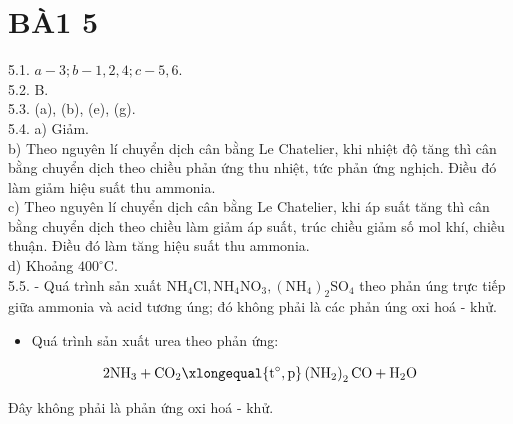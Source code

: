 \documentclass[10pt]{article}
\begin{document}
\section*{BÀ1 5}
5.1. $a-3 ; b-1,2,4 ; c-5,6$.\\
5.2. B.\\
5.3. (a), (b), (e), (g).\\
5.4. a) Giảm.\\
b) Theo nguyên lí chuyển dịch cân bằng Le Chatelier, khi nhiệt độ tăng thì cân bằng chuyển dịch theo chiều phản ứng thu nhiệt, tức phản ứng nghịch. Điều đó làm giảm hiệu suất thu ammonia.\\
c) Theo nguyên lí chuyển dịch cân bằng Le Chatelier, khi áp suất tăng thì cân bằng chuyển dịch theo chiều làm giảm áp suất, trúc chiều giảm số mol khí, chiều thuận. Điều đó làm tăng hiệu suất thu ammonia.\\
d) Khoảng $400^{\circ} \mathrm{C}$.\\
5.5. - Quá trình sản xuất $\mathrm{NH}_{4} \mathrm{Cl}, \mathrm{NH}_{4} \mathrm{NO}_{3},\left(\mathrm{NH}_{4}\right)_{2} \mathrm{SO}_{4}$ theo phản úng trực tiếp giữa ammonia và acid tương úng; đó không phải là các phản úng oxi hoá - khử.

\begin{itemize}
  \item Quá trình sản xuất urea theo phản ứng:
\end{itemize}

$$
2 \mathrm{NH}_{3}+\mathrm{CO}_{2} \xlongequal{\mathrm{t}^{\circ}, \mathrm{p}}\left(\mathrm{NH}_{2}\right)_{2} \mathrm{CO}+\mathrm{H}_{2} \mathrm{O}
$$

Đây không phải là phản ứng oxi hoá - khử.
\end{document}
